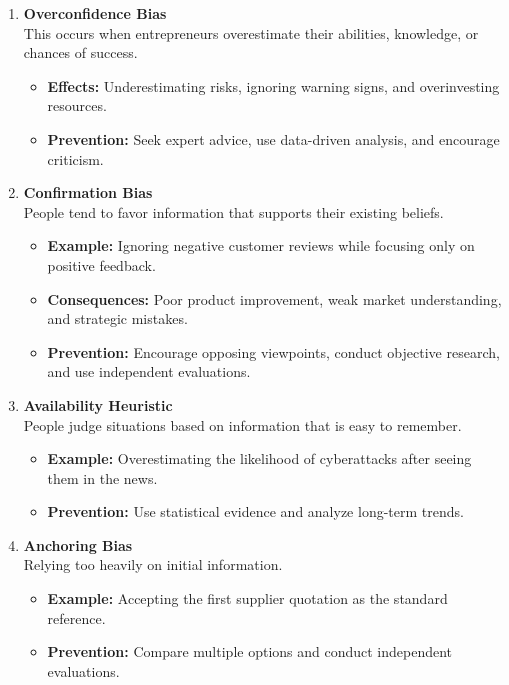 \documentclass[12pt,a4paper]{article}
\begin{document}
\begin{enumerate}
    \item \textbf{Overconfidence Bias} \\
    This occurs when entrepreneurs overestimate their abilities, knowledge, or chances of success.
    \begin{itemize}
        \item \textbf{Effects:} Underestimating risks, ignoring warning signs, and overinvesting resources.
        \item \textbf{Prevention:} Seek expert advice, use data-driven analysis, and encourage criticism.
    \end{itemize}

    \item \textbf{Confirmation Bias} \\
    People tend to favor information that supports their existing beliefs.
    \begin{itemize}
        \item \textbf{Example:} Ignoring negative customer reviews while focusing only on positive feedback.
        \item \textbf{Consequences:} Poor product improvement, weak market understanding, and strategic mistakes.
        \item \textbf{Prevention:} Encourage opposing viewpoints, conduct objective research, and use independent evaluations.
    \end{itemize}

    \item \textbf{Availability Heuristic} \\
    People judge situations based on information that is easy to remember.
    \begin{itemize}
        \item \textbf{Example:} Overestimating the likelihood of cyberattacks after seeing them in the news.
        \item \textbf{Prevention:} Use statistical evidence and analyze long-term trends.
    \end{itemize}

    \item \textbf{Anchoring Bias} \\
    Relying too heavily on initial information.
    \begin{itemize}
        \item \textbf{Example:} Accepting the first supplier quotation as the standard reference.
        \item \textbf{Prevention:} Compare multiple options and conduct independent evaluations.
    \end{itemize}


\end{enumerate}
\end{document}
